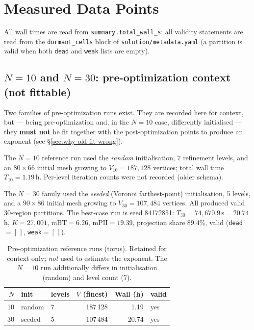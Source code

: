 \documentclass[11pt,a4paper]{article}
\begin{document}
\section{Measured Data Points}
\label{sec:data}

All wall times are read from \texttt{summary.total\_wall\_s}; all validity
statements are read from the \texttt{dormant\_cells} block of
\texttt{solution/metadata.yaml} (a partition is valid when both \texttt{dead}
and \texttt{weak} lists are empty).

\subsection{$N = 10$ and $N=30$: pre-optimization context (not fittable)}
\label{sec:pre-opt}

Two families of pre-optimization runs exist.  They are recorded here for
context, but --- being pre-optimization and, in the $N=10$ case, differently
initialised --- they \textbf{must not} be fit together with the
post-optimization points to produce an exponent (see
\S\ref{sec:why-old-fit-wrong}).

The $N=10$ reference run used the \emph{random} initialisation, 7 refinement
levels, and an $80\times66$ initial mesh growing to $V_{10} = 187{,}128$
vertices; total wall time $T_{10} = 1.19$\,h.  Per-level iteration counts were
not recorded (older schema).

The $N=30$ family used the \emph{seeded} (Voronoi farthest-point)
initialisation, 5 levels, and a $90\times86$ initial mesh growing to
$V_{30} = 107{,}484$ vertices.  All produced valid 30-region partitions.  The
best-case run is seed 84172851: $T_{30}=74{,}670.9\,\text{s}=\mathbf{20.74}$\,h,
$K=27{,}001$, $\mathrm{mBT}=6.26$, $\mathrm{mPII}=19.39$, projection share
$89.4\%$, valid (\texttt{dead}$=[\,]$, \texttt{weak}$=[\,]$).

\begin{table}[H]
\centering
\caption{Pre-optimization reference runs (torus).  Retained for context only;
\emph{not} used to estimate the exponent.  The $N=10$ run additionally differs
in initialisation (random) and level count (7).}
\label{tab:pre-opt}
\renewcommand{\arraystretch}{1.2}
\begin{tabular}{rllrrl}
\toprule
$N$ & init & levels & $V$ (finest) & Wall (h) & valid \\
\midrule
10 & random & 7 & 187\,128 & \phantom{0}1.19 & yes \\
30 & seeded & 5 & 107\,484 & 20.74 & yes \\
\bottomrule
\end{tabular}
\end{table}
\end{document}
